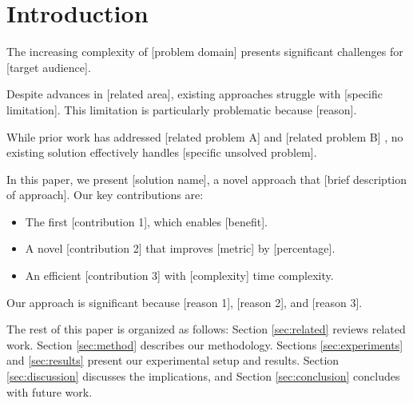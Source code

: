 \section{Introduction}
\label{sec:introduction}

The increasing complexity of [problem domain] presents significant challenges for [target audience].

Despite advances in [related area], existing approaches struggle with [specific limitation].
This limitation is particularly problematic because [reason].

While prior work has addressed [related problem A] \cite{refA} and [related problem B] \cite{refB},
no existing solution effectively handles [specific unsolved problem].

In this paper, we present [solution name], a novel approach that [brief description of approach].
Our key contributions are:
\begin{itemize}
    \item The first [contribution 1], which enables [benefit].
    \item A novel [contribution 2] that improves [metric] by [percentage].
    \item An efficient [contribution 3] with [complexity] time complexity.
\end{itemize}

Our approach is significant because [reason 1], [reason 2], and [reason 3].

The rest of this paper is organized as follows: Section \ref{sec:related} reviews related work.
Section \ref{sec:method} describes our methodology. Sections \ref{sec:experiments} and \ref{sec:results} present
our experimental setup and results. Section \ref{sec:discussion} discusses the implications,
and Section \ref{sec:conclusion} concludes with future work.
